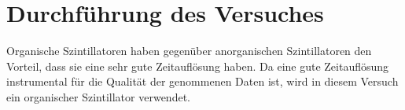 \section{Durchführung des Versuches}
\label{sec:Durchführung}

Organische Szintillatoren haben gegenüber anorganischen Szintillatoren den Vorteil, dass sie eine sehr
gute Zeitauflösung haben. Da eine gute Zeitauflösung instrumental für die Qualität der genommenen
Daten ist, wird in diesem Versuch ein organischer Szintillator verwendet.
